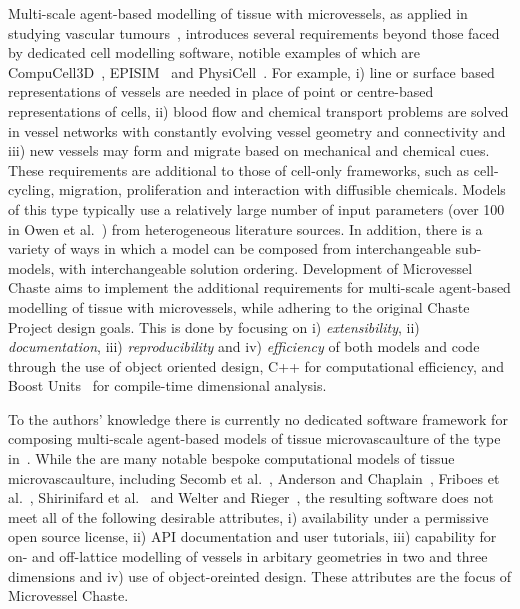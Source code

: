 \documentclass[10pt,letterpaper]{article}
\begin{document}
Multi-scale agent-based modelling of tissue with microvessels, as applied in studying vascular tumours~\cite{Owen2011}, introduces several requirements beyond those faced by dedicated cell modelling software, notible examples of which are CompuCell3D~\cite{Swat2012}, EPISIM~\cite{Sutterlin2013} and PhysiCell~\cite{Macklin2012}. For example, i) line or surface based representations of vessels are needed in place of point or centre-based representations of cells, ii) blood flow and chemical transport problems are solved in vessel networks with constantly evolving vessel geometry and connectivity and iii) new vessels may form and migrate based on mechanical and chemical cues. These requirements are additional to those of cell-only frameworks, such as cell-cycling, migration, proliferation and interaction with diffusible chemicals. Models of this type typically use a relatively large number of input parameters (over 100 in Owen et al.~\cite{Owen2011}) from heterogeneous literature sources. In addition, there is a variety of ways in which a model can be composed from interchangeable sub-models, with interchangeable solution ordering. Development of Microvessel Chaste aims to implement the additional requirements for multi-scale agent-based modelling of tissue with microvessels, while adhering to the original Chaste Project design goals. This is done by focusing on i) \emph{extensibility}, ii) \emph{documentation}, iii) \emph{reproducibility} and iv) \emph{efficiency} of both models and code through the use of object oriented design, C++ for computational efficiency, and Boost Units~\cite{boost161} for compile-time dimensional analysis. 

To the authors' knowledge there is currently no dedicated software framework for composing multi-scale agent-based models of tissue microvascaulture of the type in~\cite{Owen2011}. While the are many notable bespoke computational models of tissue microvascaulture, including Secomb et al.~\cite{Secomb2013}, Anderson and Chaplain~\cite{Anderson1998}, Friboes et al.~\cite{Frieboes2007}, Shirinifard et al.~\cite{Shirinifard2009} and Welter and Rieger~\cite{Welter2013}, the resulting software does not meet all of the following desirable attributes, i) availability under a permissive open source license, ii) API documentation and user tutorials, iii) capability for on- and off-lattice modelling of vessels in arbitary geometries in two and three dimensions and iv) use of object-oreinted design. These attributes are the focus of Microvessel Chaste.
\end{document}
